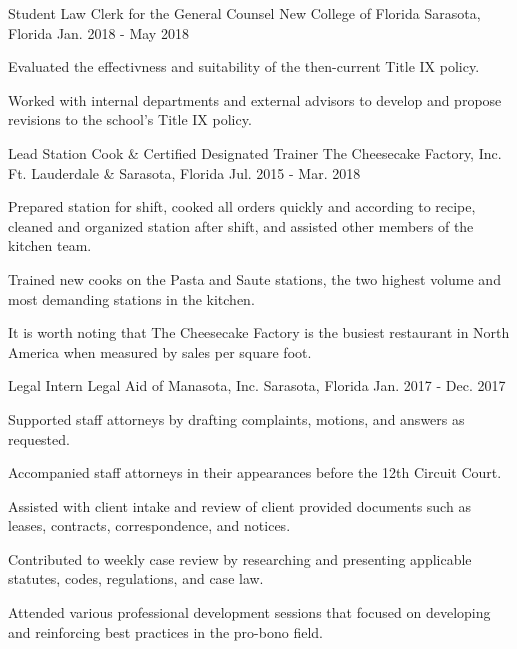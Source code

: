 \begin{cventries}
  \cventry
    {Student Law Clerk for the General Counsel} %
    {New College of Florida} %
    {Sarasota, Florida} %
    {Jan. 2018 - May 2018} %
    {
      \begin{cvitems} %
        \item {Evaluated the effectivness and suitability of the then-current Title IX policy.}
        \item {Worked with internal departments and external advisors to develop and propose revisions to the school’s Title IX policy.}
      \end{cvitems}
    }

  \cventry
    {Lead Station Cook \& Certified Designated Trainer} %
    {The Cheesecake Factory, Inc.} %
    {Ft. Lauderdale \& Sarasota, Florida} %
    {Jul. 2015 - Mar. 2018} %
    {
      \begin{cvitems} %
        \item {Prepared station for shift, cooked all orders quickly and according to recipe, cleaned and organized station after shift, and assisted other members of the kitchen team.}
        \item {Trained new cooks on the Pasta and Saute stations, the two highest volume and most demanding stations in the kitchen.}
        \item {It is worth noting that The Cheesecake Factory is the busiest restaurant in North America when measured by sales per square foot.}
      \end{cvitems}
    }

  \cventry
    {Legal Intern} %
    {Legal Aid of Manasota, Inc.} %
    {Sarasota, Florida} %
    {Jan. 2017 - Dec. 2017} %
    {
      \begin{cvitems} %
        \item {Supported staff attorneys by drafting complaints, motions, and answers as requested.}
        \item {Accompanied staff attorneys in their appearances before the 12th Circuit Court.}
        \item {Assisted with client intake and review of client provided documents such as leases, contracts, correspondence, and notices.}
        \item {Contributed to weekly case review by researching and presenting applicable statutes, codes, regulations, and case law.}
        \item {Attended various professional development sessions that focused on developing and reinforcing best practices in the pro-bono field.}
      \end{cvitems}
    }


\end{cventries}
